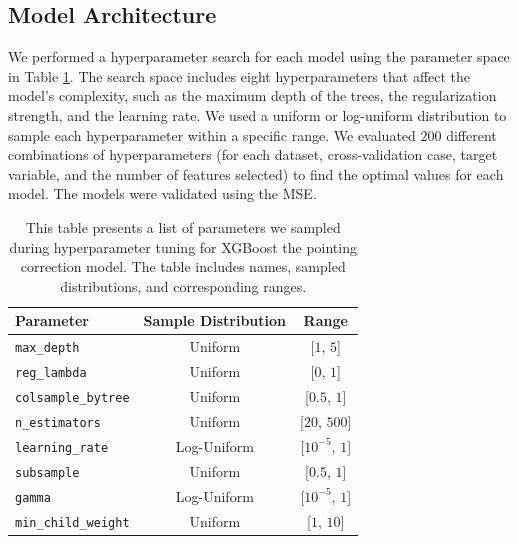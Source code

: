 \subsection{Model Architecture}
We performed a hyperparameter search for each model using the parameter space in Table \ref{tab:xgb_hyperparameters_pcorr}.
The search space includes eight hyperparameters that affect the model's complexity, such as the maximum depth of the trees, the regularization strength, and the learning rate.
We used a uniform or log-uniform distribution to sample each hyperparameter within a specific range.
We evaluated $200$ different combinations of hyperparameters (for each dataset, cross-validation case, target variable, and the number of features selected) to find the optimal values for each model.
The models were validated using the MSE.

\begin{table}[H]
    \centering
    \caption[Hyperparameter search space for XGBoost pointing correction model]{This table presents a list of parameters we sampled during hyperparameter tuning for XGBoost the pointing correction model. The table includes names, sampled distributions, and corresponding ranges.}
    \begin{tabular}{lcc}
        \toprule
        \textbf{Parameter} & \textbf{Sample Distribution} & \textbf{Range} \\ \hline
        \texttt{max\_depth} & Uniform & [$1$, $5$] \\ 
        \texttt{reg\_lambda} & Uniform & [$0$, $1$] \\ 
        \texttt{colsample\_bytree} & Uniform & [$0.5$, $1$] \\ 
        \texttt{n\_estimators} & Uniform & [$20$, $500$] \\ 
        \texttt{learning\_rate} & Log-Uniform & [$10^{-5}$, $1$] \\ 
        \texttt{subsample} & Uniform & [$0.5$, $1$] \\ 
        \texttt{gamma} & Log-Uniform & [$10^{-5}$, $1$] \\ 
        \texttt{min\_child\_weight} & Uniform & [$1$, $10$] \\ 
        \bottomrule
    \end{tabular}
    \label{tab:xgb_hyperparameters_pcorr}
\end{table}



